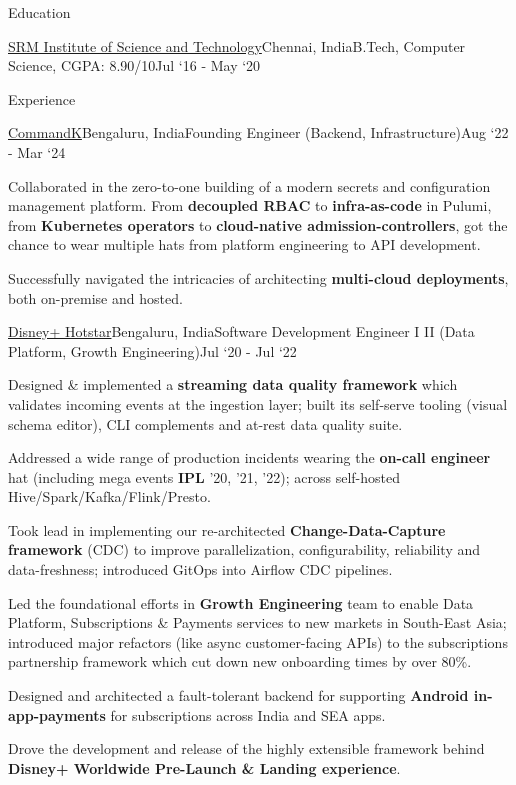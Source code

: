 \documentclass{resume}
\begin{document}
\begin{rSection}{Education}
  \begin{rEmptySubsection}{\href{https://www.srmist.edu.in/}{SRM Institute of Science and Technology}}{Chennai, India}{B.Tech, Computer Science, CGPA: 8.90/10}{Jul `16 - May `20}
  \end{rEmptySubsection}

\end{rSection}

\begin{rSection}{Experience}

  \begin{rSubsection}{\href{https://commandk.dev}{CommandK}}{Bengaluru, India}{Founding Engineer (Backend, Infrastructure)}{Aug `22 - Mar `24}
    \item Collaborated in the zero-to-one building of a modern secrets and configuration management platform. From \textbf{decoupled RBAC} to \textbf{infra-as-code} in Pulumi, from \textbf{Kubernetes operators} to \textbf{cloud-native admission-controllers}, got the chance to wear multiple hats from platform engineering to API development.
    \item Successfully navigated the intricacies of architecting \textbf{multi-cloud deployments}, both on-premise and hosted.
          \end{rSubsection}

  \begin{rSubsection}{\href{https://tech.hotstar.com}{Disney+ Hotstar}}{Bengaluru, India}{Software Development Engineer I \textrightarrow II (Data Platform, Growth Engineering)}{Jul `20 - Jul `22}
    \item Designed \& implemented a \textbf{streaming data quality framework} which validates incoming events at the ingestion layer; built its self-serve tooling (visual schema editor), CLI complements and at-rest data quality suite.
    \item Addressed a wide range of production incidents wearing the \textbf{on-call engineer} hat (including mega events \textbf{IPL} '20, '21, '22); across self-hosted Hive/Spark/Kafka/Flink/Presto.
    \item Took lead in implementing our re-architected \textbf{Change-Data-Capture framework} (CDC) to improve parallelization, configurability, reliability and data-freshness; introduced GitOps into Airflow CDC pipelines.
    \item Led the foundational efforts in \textbf{Growth Engineering} team to enable Data Platform, Subscriptions \& Payments services to new markets in South-East Asia; introduced major refactors (like async customer-facing APIs) to the subscriptions partnership framework which cut down new onboarding times by over 80\%.
    \item Designed and architected a fault-tolerant backend for supporting \textbf{Android in-app-payments} for subscriptions across India and SEA apps.
    \item Drove the development and release of the highly extensible framework behind \textbf{Disney+ Worldwide Pre-Launch \& Landing experience}.
      \end{rSubsection}


\end{rSection}
\end{document}
